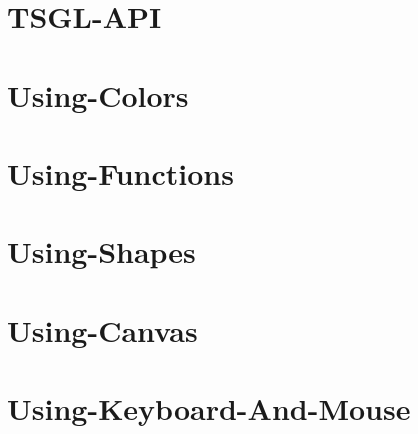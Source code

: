 \documentclass[twoside]{book}
\begin{document}
\chapter{T\-S\-G\-L-\/\-A\-P\-I}
\label{md__home_kodemonkey_workspace__t_s_g_l_docs-wiki__t_s_g_l-_a_p_i}
\hypertarget{md__home_kodemonkey_workspace__t_s_g_l_docs-wiki__t_s_g_l-_a_p_i}{}

\chapter{Using-\/\-Colors}
\label{md__home_kodemonkey_workspace__t_s_g_l_docs-wiki_tutorials__using-_colors}
\hypertarget{md__home_kodemonkey_workspace__t_s_g_l_docs-wiki_tutorials__using-_colors}{}

\chapter{Using-\/\-Functions}
\label{md__home_kodemonkey_workspace__t_s_g_l_docs-wiki_tutorials__using-_functions}
\hypertarget{md__home_kodemonkey_workspace__t_s_g_l_docs-wiki_tutorials__using-_functions}{}

\chapter{Using-\/\-Shapes}
\label{md__home_kodemonkey_workspace__t_s_g_l_docs-wiki_tutorials__using-_shapes}
\hypertarget{md__home_kodemonkey_workspace__t_s_g_l_docs-wiki_tutorials__using-_shapes}{}

\chapter{Using-\/\-Canvas}
\label{md__home_kodemonkey_workspace__t_s_g_l_docs-wiki__using-_canvas}
\hypertarget{md__home_kodemonkey_workspace__t_s_g_l_docs-wiki__using-_canvas}{}

\chapter{Using-\/\-Keyboard-\/\-And-\/\-Mouse}
\label{md__home_kodemonkey_workspace__t_s_g_l_docs-wiki__using-_keyboard-_and-_mouse}
\hypertarget{md__home_kodemonkey_workspace__t_s_g_l_docs-wiki__using-_keyboard-_and-_mouse}{}

\end{document}
